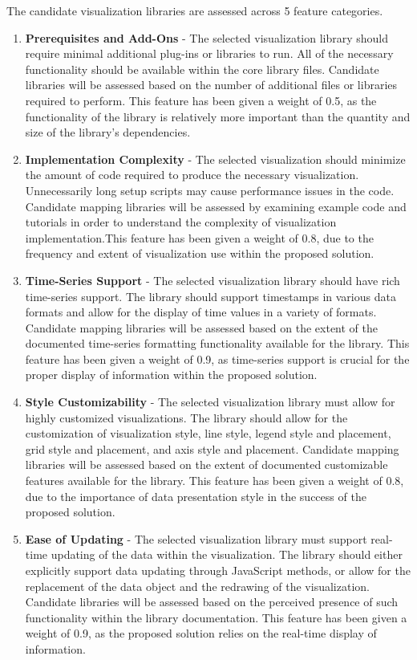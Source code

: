 \documentclass{report}
\begin{document}
The candidate visualization libraries are assessed across 5 feature categories.

\begin{enumerate}

\item \textbf{Prerequisites and Add-Ons} - The selected visualization library should require minimal additional plug-ins or libraries to run. All of the necessary functionality should be available within the core library files. Candidate libraries will be assessed based on the number of additional files or libraries required to perform. This feature has been given a weight of 0.5, as the functionality of the library is relatively more important than the quantity and size of the library's dependencies.

\item \textbf{Implementation Complexity} - The selected visualization should minimize the amount of code required to produce the necessary visualization. Unnecessarily long setup scripts may cause performance issues in the code. Candidate mapping libraries will be assessed by examining example code and tutorials in order to understand the complexity of visualization implementation.This feature has been given a weight of 0.8, due to the frequency and extent of visualization use within the proposed solution.

\item \textbf{Time-Series Support} - The selected visualization library should have rich time-series support. The library should support timestamps in various data formats and allow for the display of time values in a variety of formats. Candidate mapping libraries will be assessed based on the extent of the documented time-series formatting functionality available for the library. This feature has been given a weight of 0.9, as time-series support is crucial for the proper display of information within the proposed solution.

\item \textbf{Style Customizability} - The selected visualization library must allow for highly customized visualizations. The library should allow for the customization of visualization style, line style, legend style and placement, grid style and placement, and axis style and placement. Candidate mapping libraries will be assessed based on the extent of documented customizable features available for the library. This feature has been given a weight of 0.8, due to the importance of data presentation style in the success of the proposed solution.

\item \textbf{Ease of Updating} - The selected visualization library must support real-time updating of the data within the visualization. The library should either explicitly support data updating through JavaScript methods, or allow for the replacement of the data object and the redrawing of the visualization. Candidate libraries will be assessed based on the perceived presence of such functionality within the library documentation. This feature has been given a weight of 0.9, as the proposed solution relies on the real-time display of information.

\end{enumerate}
\end{document}
